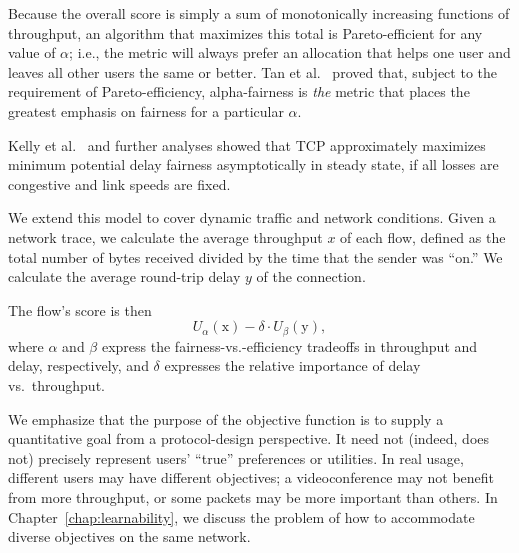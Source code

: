 Because the overall score is simply a sum of monotonically increasing
functions of throughput, an algorithm that maximizes this total is
Pareto-efficient for any value of $\alpha$; i.e., the metric will
always prefer an allocation that helps one user and leaves all other
users the same or better. Tan et al.~\cite{Tan09} proved that, subject
to the requirement of Pareto-efficiency, alpha-fairness is \emph{the}
metric that places the greatest emphasis on fairness for a particular
$\alpha$.

Kelly et al.~\cite{Kelly98} and further analyses showed that TCP
approximately maximizes minimum potential delay fairness
asymptotically in steady state, if all losses are congestive and link
speeds are fixed.

We extend this model to cover dynamic traffic and network
conditions. Given a network trace, we calculate the average throughput
$x$ of each flow, defined as the total number of bytes received
divided by the time that the sender was ``on.'' We calculate the
average round-trip delay $y$ of the connection.

The flow's score is then 
\begin{equation}
U_\alpha(\textrm{x}) - \delta \cdot U_\beta(\textrm{y}),
\label{eq:util}
\end{equation}
where $\alpha$ and $\beta$ express the fairness-vs.-efficiency
tradeoffs in throughput and delay, respectively, and $\delta$
expresses the relative importance of delay vs.~throughput.%


We emphasize that the purpose of the objective function is to supply a
quantitative goal from a protocol-design perspective. It need not
(indeed, does not) precisely represent users' ``true'' preferences or
utilities. In real usage, different users may have different
objectives; a videoconference may not benefit from more throughput, or
some packets may be more important than others. In
Chapter~\ref{chap:learnability}, we discuss the problem of how to
accommodate diverse objectives on the same network.



